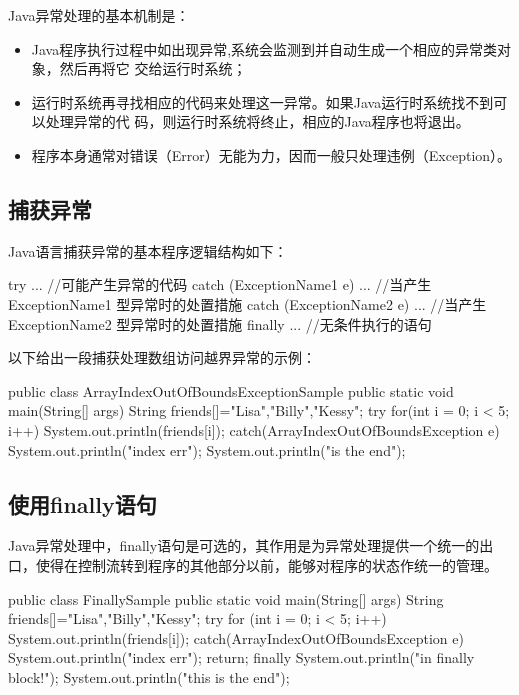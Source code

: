 Java异常处理的基本机制是：

\begin{itemize}
\item Java程序执行过程中如出现异常,系统会监测到并自动生成一个相应的异常类对象，然后再将它
  交给运行时系统；
\item 运行时系统再寻找相应的代码来处理这一异常。如果Java运行时系统找不到可以处理异常的代
  码，则运行时系统将终止，相应的Java程序也将退出。
\item 程序本身通常对错误（Error）无能为力，因而一般只处理违例（Exception）。
\end{itemize}

\subsection{捕获异常}

Java语言捕获异常的基本程序逻辑结构如下：

\begin{javaCode}
try {
  ... //可能产生异常的代码
} catch (ExceptionName1 e) {
  ... //当产生 ExceptionName1 型异常时的处置措施
} catch (ExceptionName2 e) {
  ... //当产生 ExceptionName2 型异常时的处置措施
} finally {
  ... //无条件执行的语句
}
\end{javaCode}

以下给出一段捕获处理数组访问越界异常的示例：


\begin{javaCode}
public class ArrayIndexOutOfBoundsExceptionSample {
  public static void main(String[] args) {
    String friends[]={"Lisa","Billy","Kessy"};
    try {
      for(int i = 0; i < 5; i++) {
        System.out.println(friends[i]);
      }
    } catch(ArrayIndexOutOfBoundsException e) {
      System.out.println("index err");
    }
    System.out.println("\nthis is the end");
  }
}
\end{javaCode}

\subsection{使用finally语句}

Java异常处理中，finally语句是可选的，其作用是为异常处理提供一个统一的出口，使得在控制流转到程序的其他部分以前，能够对程序的状态作统一的管理。


\begin{javaCode}
public class FinallySample {
  public static void main(String[] args) {
    String friends[]={"Lisa","Billy","Kessy"};
    try {
      for (int i = 0; i < 5; i++) {
        System.out.println(friends[i]);
      }
    } catch(ArrayIndexOutOfBoundsException e) {
      System.out.println("index err");
      return;
    } finally {
      System.out.println("in finally block!");
    }
    System.out.println("this is the end");
  }
}
  
\end{javaCode}


